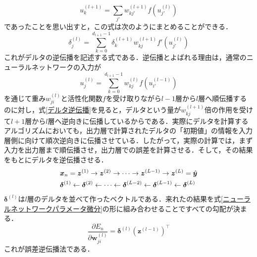 \documentclass[a4paper,11pt]{jsreport}
\begin{document}
\begin{equation}
  u_k^{(l+1)}
  = \sum_{j'} w_{kj'}^{(l+1)} f(u_{j'}^{(l)})
\end{equation}
であったことを思い出すと，この式は次のようにまとめることができる．
\begin{equation}
  \delta_j^{(l)}
  = \sum_{k=0}^{d_{l+1}-1} \delta_k^{(l+1)} w_{kj}^{(l+1)} f'(u_{j'}^{(l)})
\end{equation}
これがデルタの逆伝播を記述する式である．逆伝播とよばれる理由は，通常のニューラルネットワークの入力が
\begin{equation}
  u_j^{(l)}
  = \sum_{k=0}^{d_{l+1}-1} w_{kj}^{(l)} f(u_{i'}^{(l-1)}) \label{デルタ逆伝播}
\end{equation}
を通じて重み$w_{ji}^{(l)}$と活性化関数$f$を受け取りながら$l-1$層から$l$層へ順伝播するのに対し，式\ref{デルタ逆伝播}を見ると，デルタという量が$w_{kj}^{(l+1)}$倍の作用を受けて$l+1$層から$l$層へ逆向きに伝播しているからである．実際にデルタを計算するアルゴリズムにおいても，出力層で計算されたデルタの「初期値」の情報を入力層側に向けて順次逆向きに伝播させている．したがって，実際の計算では，まず入力を出力層まで順伝播させ，出力層での誤差を計算させる．そして，その結果をもとにデルタを逆伝播させる．
\begin{align}
  &\bm{x}_n = \bm{z}^{(1)} \rightarrow \bm{z}^{(2)} \rightarrow \cdots \rightarrow \bm{z}^{(L-1)} \rightarrow \bm{z}^{(L)} = \hat{\bm{y}} \notag\\
  &\bm{\delta}^{(1)} \leftarrow \bm{\delta}^{(2)} \leftarrow \cdots \leftarrow \bm{\delta}^{(L-2)} \leftarrow \bm{\delta}^{(L-1)} \leftarrow \bm{\delta}^{(L)}
\end{align}
$\bm{\delta}^{(l)}$は$l$層のデルタを並べて作ったベクトルである．来れたの結果を式\ref{ニューラルネットワークパラメータ微分}の形に組み合わせることですべての勾配が決まる．
\begin{equation}
  \frac{\partial E_n}{\partial \bm{w}_{ji}^{(l)}}
  = \bm{\delta}^{(l)} \left( \bm{z}^{(l-1)} \right)^{\top}
\end{equation}
これが誤差逆伝播法である．
\end{document}
